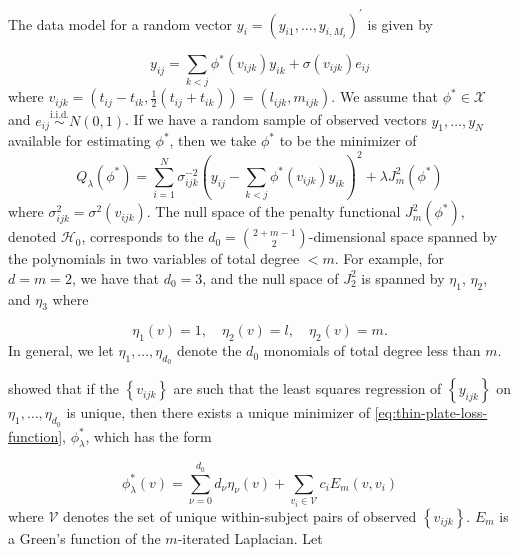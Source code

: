 \documentclass[12pt]{article}
\theoremstyle{definition}
\begin{document}
\bigskip
The data model for a random vector $y_i = \left(y_{i1},\dots, y_{i,M_i} \right)^\prime$ is given by 

\begin{equation} \label{eq:functional-vc-ar-model}
y_{ij} = \sum_{k<j} \phi^*\left(v_{ijk}\right) y_{ik} + \sigma\left(v_{ijk}\right) e_{ij}
\end{equation}
\noindent
where $v_{ijk} = \left(t_{ij}-t_{ik}, \frac{1}{2}\left(t_{ij}+t_{ik}\right)\right) = \left(l_{ijk}, m_{ijk}\right)$. We assume that $\phi^* \in \mathcal{X}$ and $e_{ij} \stackrel{\text{i.i.d.}}{\sim} N\left(0,1\right)$. If we have a random sample of observed vectors $y_1,\dots,y_N$ available for estimating $\phi^*$, then we take $\phi^*$ to be the minimizer of
\begin{equation} \label{eq:thin-plate-loss-function}
Q_\lambda \left( \phi^* \right) = \sum_{i=1}^N \sigma^{-2}_{ijk}\left( y_{ij} - \sum_{k<j} \phi^*\left(v_{ijk}\right) y_{ik}  \right)^2 + \lambda J_m^2 \left( \phi^* \right)
\end{equation}
\noindent
where $\sigma^{2}_{ijk} = \sigma^2\left(v_{ijk}\right)$. The null space of the penalty functional $J_m^2 \left( \phi^* \right)$, denoted $\mathcal{H}_0$, corresponds to the $d_0={2+m-1 \choose 2}$-dimensional space spanned by the polynomials in two variables of total degree $< m$. For example, for $d=m=2$, we have that $d_0=3$, and the null space of $J^2_2$ is spanned by $\eta_1$, $\eta_2$, and $\eta_3$ where

\[
\eta_1\left(v\right) = 1,\quad \eta_2\left(v\right) = l, \quad \eta_2\left(v\right) = m.
\]
\noindent
In general, we let $\eta_1,\dots, \eta_{d_0}$ denote the $d_0$ monomials of total degree less than $m$.

\bigskip

\citet{duchon1977splines} showed that if the $\left\{ v_{ijk} \right\}$ are such that the least squares regression of $\left\{ y_{ijk}\right\}$ on $\eta_1,\dots, \eta_{d_0}$ is unique, then there exists a unique minimizer of \ref{eq:thin-plate-loss-function}, $\phi^*_\lambda$, which has the form

\begin{equation} \label{eq:unique-minimizer-of-loss}
\phi^*_\lambda\left( v \right) = \sum_{\nu=0}^{d_0} d_\nu \eta_\nu \left( v \right) + \sum_{v_i \in \mathcal{V}} c_{i} E_m\left(v,v_i \right)
\end{equation}
\noindent
where $\mathcal{V}$ denotes the set of unique within-subject pairs of observed $\left\{ v_{ijk} \right\}$. $E_m$ is a Green's function of the $m$-iterated Laplacian. Let
\end{document}
